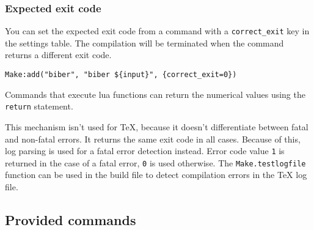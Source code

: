 \hypertarget{expected-exit-code}{%
\subsubsection{Expected exit code}\label{expected-exit-code}}

You can set the expected exit code from a command with a
\texttt{correct\_exit} key in the settings table. The compilation will
be terminated when the command returns a different exit code.

\begin{verbatim}
Make:add("biber", "biber ${input}", {correct_exit=0})
\end{verbatim}

Commands that execute lua functions can return the numerical values
using the \texttt{return} statement.

This mechanism isn't used for \TeX, because it doesn't differentiate
between fatal and non-fatal errors. It returns the same exit code in all
cases. Because of this, log parsing is used for a fatal error detection
instead. Error code value \texttt{1} is returned in the case of a fatal
error, \texttt{0} is used otherwise. The \texttt{Make.testlogfile}
function can be used in the build file to detect compilation errors in
the TeX log file.

\hypertarget{provided-commands}{%
\subsection{Provided commands}\label{provided-commands}}

